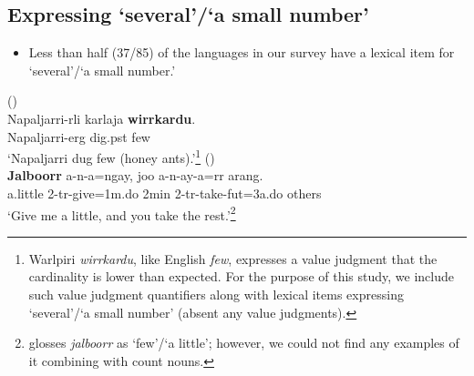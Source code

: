 \documentclass{article}
\makeatletter
\newcommand{\ofy}{/85} %
\makeatother
\begin{document}
\subsection{Expressing `several'/`a small number'}

\begin{itemize}
\item Less than half (37\ofy) of the languages in our survey have a lexical item for `several'/`a small number.'
\end{itemize}
\begin{exe}
   (\citealt[9]{bowler17})\\
  \gll Napaljarri-rli karlaja \textbf{wirrkardu}.\\
  Napaljarri-{\sc erg} dig.{\sc pst} few\\
  \glt `Napaljarri dug few (honey ants).'\footnote{Warlpiri \textit{wirrkardu}, like English \textit{few}, expresses a value judgment that the cardinality is lower than expected. For the purpose of this study, we include such value judgment quantifiers along with lexical items expressing `several'/`a small number' (absent any value judgments).}
   (\citealt[271]{bowern12})\\  
  \gll \textbf{Jalboorr} a-n-a=ngay, joo a-n-ay-a=rr arang.\\
  a.little 2-{\sc tr}-give=1{\sc m.do} 2{\sc min} 2-{\sc tr}-take-{\sc fut}=3{\sc a.do} others\\
  \glt `Give me a little, and you take the rest.'\footnote{\cite{bowern12} glosses \textit{jalboorr} as `few'/`a little'; however, we could not find any examples of it combining with count nouns.}
\end{exe}
\end{document}
